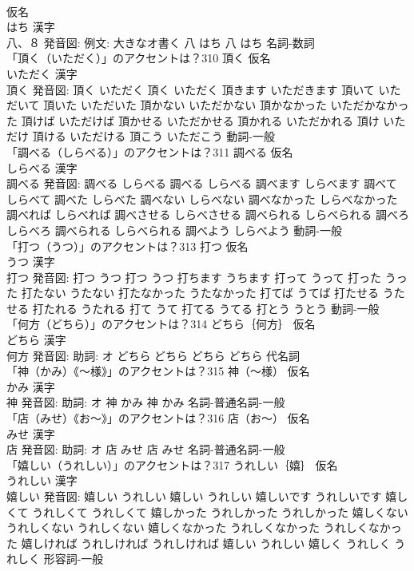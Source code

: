 \documentclass[8pt]{extreport}
\begin{document}
\begin{CJK}{UTF8}{min}
\\	仮名　
\\	はち 漢字　
\\	八、８ 発音図: 例文: 大きなオ書く	八 はち		八 はち				名詞-数詞 
\\	「頂く（いただく）」のアクセントは？310	頂く 仮名　
\\	いただく 漢字　
\\	頂く 発音図:	頂く いただく		頂く いただく 頂きます いただきます 頂いて いただいて 頂いた いただいた 頂かない いただかない 頂かなかった いただかなかった 頂けば いただけば 頂かせる いただかせる 頂かれる いただかれる 頂け いただけ 頂ける いただける 頂こう いただこう				動詞-一般 
\\	「調べる（しらべる）」のアクセントは？311	調べる 仮名　
\\	しらべる 漢字　
\\	調べる 発音図:	調べる しらべる		調べる しらべる 調べます しらべます 調べて しらべて 調べた しらべた 調べない しらべない 調べなかった しらべなかった 調べれば しらべれば 調べさせる しらべさせる 調べられる しらべられる 調べろ しらべろ 調べられる しらべられる 調べよう しらべよう				動詞-一般 
\\	「打つ（うつ）」のアクセントは？313	打つ 仮名　
\\	うつ 漢字　
\\	打つ 発音図:	打つ うつ		打つ うつ 打ちます うちます 打って うって 打った うった 打たない うたない 打たなかった うたなかった 打てば うてば 打たせる うたせる 打たれる うたれる 打て うて 打てる うてる 打とう うとう				動詞-一般 
\\	「何方（どちら）」のアクセントは？314	どちら｛何方｝ 仮名　
\\	どちら 漢字　
\\	何方 発音図: 助詞: オ	どちら どちら		どちら どちら				代名詞 
\\	「神（かみ）《〜様》」のアクセントは？315	神（〜様） 仮名　
\\	かみ 漢字　
\\	神 発音図: 助詞: オ	神 かみ		神 かみ				名詞-普通名詞-一般 
\\	「店（みせ）《お〜》」のアクセントは？316	店（お〜） 仮名　
\\	みせ 漢字　
\\	店 発音図: 助詞: オ	店 みせ		店 みせ				名詞-普通名詞-一般 
\\	「嬉しい（うれしい）」のアクセントは？317	うれしい｛嬉｝ 仮名　
\\	うれしい 漢字　
\\	嬉しい 発音図:	嬉しい うれしい		嬉しい うれしい 嬉しいです うれしいです 嬉しくて うれしくて うれしくて 嬉しかった うれしかった うれしかった 嬉しくない うれしくない うれしくない 嬉しくなかった うれしくなかった うれしくなかった 嬉しければ うれしければ うれしければ 嬉しい うれしい 嬉しく うれしく うれしく				形容詞-一般 

\end{CJK}
\end{document}
